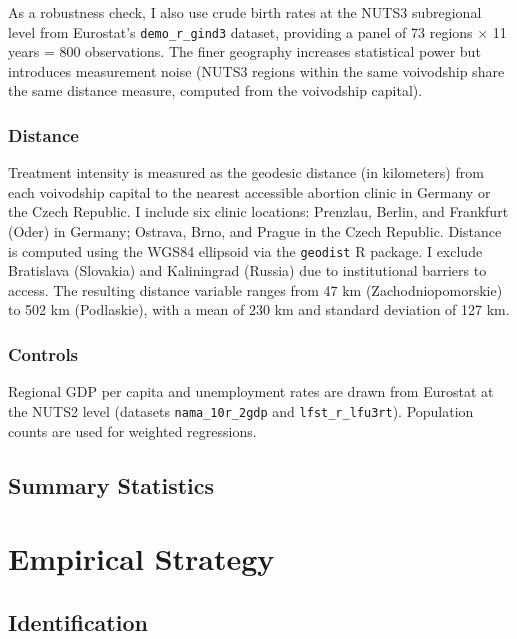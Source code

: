 \documentclass[12pt]{article}
\begin{document}
As a robustness check, I also use crude birth rates at the NUTS3 subregional level from Eurostat's \texttt{demo\_r\_gind3} dataset, providing a panel of 73 regions $\times$ 11 years = 800 observations. The finer geography increases statistical power but introduces measurement noise (NUTS3 regions within the same voivodship share the same distance measure, computed from the voivodship capital).

\subsubsection*{Distance} Treatment intensity is measured as the geodesic distance (in kilometers) from each voivodship capital to the nearest accessible abortion clinic in Germany or the Czech Republic. I include six clinic locations: Prenzlau, Berlin, and Frankfurt (Oder) in Germany; Ostrava, Brno, and Prague in the Czech Republic. Distance is computed using the WGS84 ellipsoid via the \texttt{geodist} R package. I exclude Bratislava (Slovakia) and Kaliningrad (Russia) due to institutional barriers to access. The resulting distance variable ranges from 47 km (Zachodniopomorskie) to 502 km (Podlaskie), with a mean of 230 km and standard deviation of 127 km.

\subsubsection*{Controls} Regional GDP per capita and unemployment rates are drawn from Eurostat at the NUTS2 level (datasets \texttt{nama\_10r\_2gdp} and \texttt{lfst\_r\_lfu3rt}). Population counts are used for weighted regressions.

\subsection{Summary Statistics}




\section{Empirical Strategy}
\label{sec:strategy}

\subsection{Identification}
\end{document}
